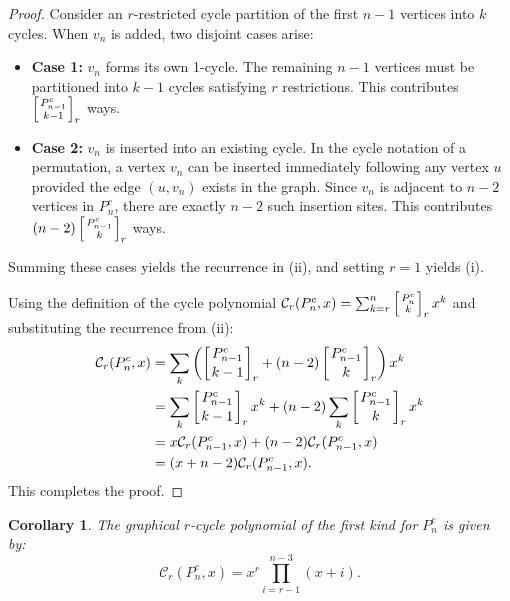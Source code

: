 \documentclass{amsart}
\newcounter{cases}
\newcommand{\str}[2]{\left[ \genfrac{}{}{0pt}{}{#1}{#2} \right]_r}
\newcommand{\cyc}{\mathcal{C}}
\newtheorem{corollary}[theorem]{Corollary}
\theoremstyle{definition}
\begin{document}
\begin{proof}
 Consider an $r$-restricted cycle partition of the first $n-1$ vertices into $k$ cycles. When $v_n$ is added, two disjoint cases arise:
\begin{itemize}
    \item \textbf{Case 1:} $v_n$ forms its own 1-cycle. The remaining $n-1$ vertices must be partitioned into $k-1$ cycles satisfying $r$ restrictions. This contributes $\str{P_{n-1}^c}{k-1}$ ways.
    \item \textbf{Case 2:} $v_n$ is inserted into an existing cycle. In the cycle notation of a permutation, a vertex $v_n$ can be inserted immediately following any vertex $u$ provided the edge $(u, v_n)$ exists in the graph. Since $v_n$ is adjacent to $n-2$ vertices in $P_n^c$, there are exactly $n-2$ such insertion sites. This contributes $(n-2) \str{P_{n-1}^c}{k}$ ways.
\end{itemize}
Summing these cases yields the recurrence in (ii), and setting $r=1$ yields (i).

 Using the definition of the cycle polynomial $\cyc_r(P_n^c, x) = \sum_{k=r}^n \str{P_n^c}{k} x^k$ and substituting the recurrence from (ii):
\begin{align*}
    \cyc_r(P_n^c, x) &= \sum_{k} \left( \str{P_{n-1}^c}{k-1} + (n-2) \str{P_{n-1}^c}{k} \right) x^k \\
    &= \sum_{k} \str{P_{n-1}^c}{k-1} x^k + (n-2) \sum_{k} \str{P_{n-1}^c}{k} x^k \\
    &= x \cyc_r(P_{n-1}^c, x) + (n-2) \cyc_r(P_{n-1}^c, x) \\
    &= (x + n - 2) \cyc_r(P_{n-1}^c, x).
\end{align*}
This completes the proof.
\end{proof}


\begin{corollary}
The graphical $r$-cycle polynomial of the first kind for $P_n^c$ is given by:
\begin{equation*}
    \mathcal{C}_r(P_n^c, x) = x^r \prod_{i=r-1}^{n-3} (x + i).
\end{equation*}
\end{corollary}


\end{document}
